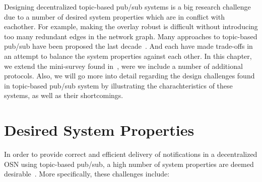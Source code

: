 Designing decentralized topic-based pub/sub systems is a big research
challenge due to a number of desired system properties which are in
conflict with eachother. For example, making the
overlay robust is difficult without introducing too many redundant edges
in the network graph.  Many approaches to topic-based pub/sub have been
proposed the last
decade~\cites{Baehni:2004}{Castro:2002}{Chockler:2007}{Rahimian:2011}{Girdzijauskas:2010}{Matos:2010}{Wong:2008}{Zhuang:2001}.
And each have made trade-offs in an attempt to balance the system
properties against each other. In this chapter, we extend the
mini-survey found in~\cite{Setty:2012}, were we include a number of
additional protocols. Also, we will go more into detail regarding the
design challenges found in topic-based pub/sub system by illustrating
the charachteristics of these systems, as well as their shortcomings.

\section{Desired System Properties}

In order to provide correct and efficient delivery of notifications in a
decentralized OSN using topic-based pub/sub, a high number of system
properties are deemed desirable~\cite{Setty:2012}. More specifically,
these challenges include:

